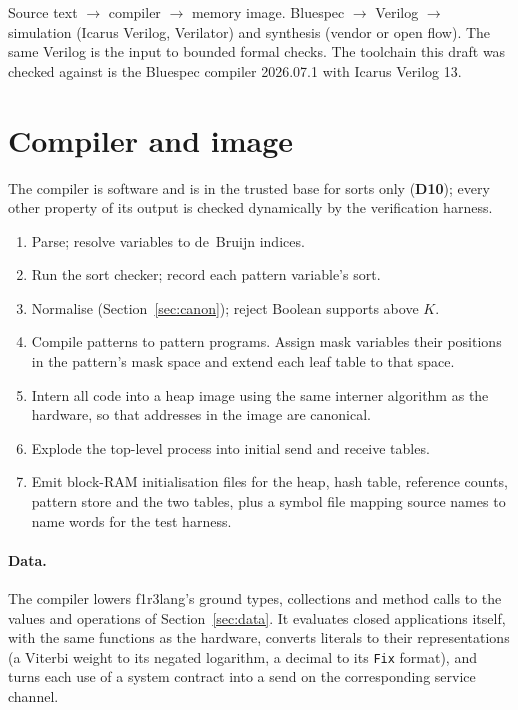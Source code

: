 \documentclass[10.5pt,a4paper]{extarticle}
\newcommand{\kw}[1]{\texttt{#1}}
\newcommand{\dec}[1]{\textbf{D#1}}
\theoremstyle{definition}
\theoremstyle{remark}
\begin{document}
Source text $\to$ compiler $\to$ memory image. Bluespec $\to$ Verilog $\to$
simulation (Icarus Verilog, Verilator) and synthesis (vendor or open flow).
The same Verilog is the input to bounded formal checks. The toolchain this
draft was checked against is the Bluespec compiler 2026.07.1 with Icarus
Verilog 13.

\section{Compiler and image}\label{sec:compiler}

The compiler is software and is in the trusted base for sorts only
(\dec{10}); every other property of its output is checked dynamically by the
verification harness.

\begin{enumerate}
\item Parse; resolve variables to de~Bruijn indices.
\item Run the sort checker; record each pattern variable's sort.
\item Normalise (Section~\ref{sec:canon}); reject Boolean supports above $K$.
\item Compile patterns to pattern programs. Assign mask variables their
positions in the pattern's mask space and extend each leaf table to that
space.
\item Intern all code into a heap image using the same interner algorithm
as the hardware, so that addresses in the image are canonical.
\item Explode the top-level process into initial send and receive tables.
\item Emit block-RAM initialisation files for the heap, hash table, reference
counts, pattern store and the two tables, plus a symbol file mapping source
names to name words for the test harness.
\end{enumerate}

\paragraph{Data.} The compiler lowers f1r3lang's ground types, collections
and method calls to the values and operations of Section~\ref{sec:data}. It
evaluates closed applications itself, with the same functions as the
hardware, converts literals to their representations (a Viterbi weight to
its negated logarithm, a decimal to its \kw{Fix} format), and turns each use
of a system contract into a send on the corresponding service channel.
\end{document}
